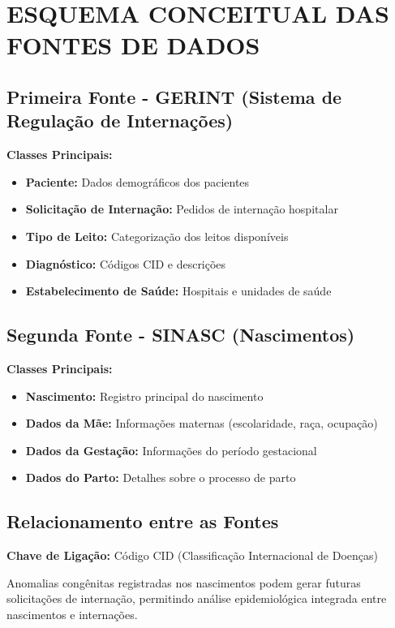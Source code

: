 \documentclass[12pt,a4paper]{article}
\begin{document}
\section{ESQUEMA CONCEITUAL DAS FONTES DE DADOS}

\subsection{Primeira Fonte - GERINT (Sistema de Regulação de Internações)}

\textbf{Classes Principais:}
\begin{itemize}
    \item \textbf{Paciente:} Dados demográficos dos pacientes
    \item \textbf{Solicitação de Internação:} Pedidos de internação hospitalar
    \item \textbf{Tipo de Leito:} Categorização dos leitos disponíveis
    \item \textbf{Diagnóstico:} Códigos CID e descrições
    \item \textbf{Estabelecimento de Saúde:} Hospitais e unidades de saúde
\end{itemize}

\subsection{Segunda Fonte - SINASC (Nascimentos)}

\textbf{Classes Principais:}
\begin{itemize}
    \item \textbf{Nascimento:} Registro principal do nascimento
    \item \textbf{Dados da Mãe:} Informações maternas (escolaridade, raça, ocupação)
    \item \textbf{Dados da Gestação:} Informações do período gestacional
    \item \textbf{Dados do Parto:} Detalhes sobre o processo de parto
\end{itemize}

\subsection{Relacionamento entre as Fontes}

\textbf{Chave de Ligação:} Código CID (Classificação Internacional de Doenças)

Anomalias congênitas registradas nos nascimentos podem gerar futuras solicitações de internação, permitindo análise epidemiológica integrada entre nascimentos e internações.
\end{document}
